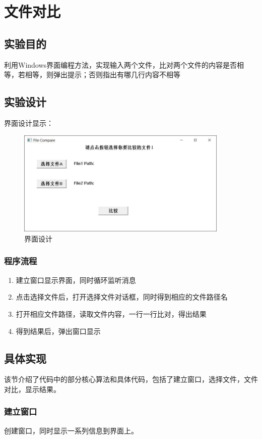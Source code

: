 \chapter{文件对比}

\section{实验目的}
利用Windows界面编程方法，实现输入两个文件，比对两个文件的内容是否相等，若相等，则弹出提示；否则指出有哪几行内容不相等
\section{实验设计}
界面设计显示：
\begin{figure}[H]
    \centering
    \includegraphics[width= 0.9\textwidth]{assets/界面设计}
    \caption{界面设计}
    \label{界面设计}
\end{figure}

\subsection{程序流程}
\begin{enumerate}
    \item 建立窗口显示界面，同时循环监听消息
    \item 点击选择文件后，打开选择文件对话框，同时得到相应的文件路径名
    \item 打开相应文件路径，读取文件内容，一行一行比对，得出结果
    \item 得到结果后，弹出窗口显示
\end{enumerate}

\section{具体实现}
该节介绍了代码中的部分核心算法和具体代码，包括了建立窗口，选择文件，文件对比，显示结果。

\subsection{建立窗口}
创建窗口，同时显示一系列信息到界面上。

